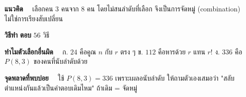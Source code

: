 %

\item
{}

\textbf{แนวคิด}~~ เลือกคน 3 คนจาก 8 คน โดยไม่สนลำดับที่เลือก จึงเป็นการจัดหมู่
(combination) ไม่ใช่การเรียงสับเปลี่ยน

\textbf{วิธีทำ}
\textbf{ตอบ} $56$ วิธี

\textbf{ทำไมตัวเลือกอื่นผิด}~~ ก. $24$ คือคูณ $n$ กับ $r$ ตรง ๆ
ข. $112$ คือหารด้วย $r$ แทน $r!$
ง. $336$ คือ $P(8,3)$ ของคนที่นับลำดับด้วย

\textbf{จุดพลาดที่พบบ่อย}~~ ใช้ $P(8,3)=336$ เพราะเผลอนับลำดับ ให้ถามตัวเองเสมอว่า
"สลับตำแหน่งกันแล้วเป็นคำตอบเดิมไหม" ถ้าเดิม = จัดหมู่

%
%
